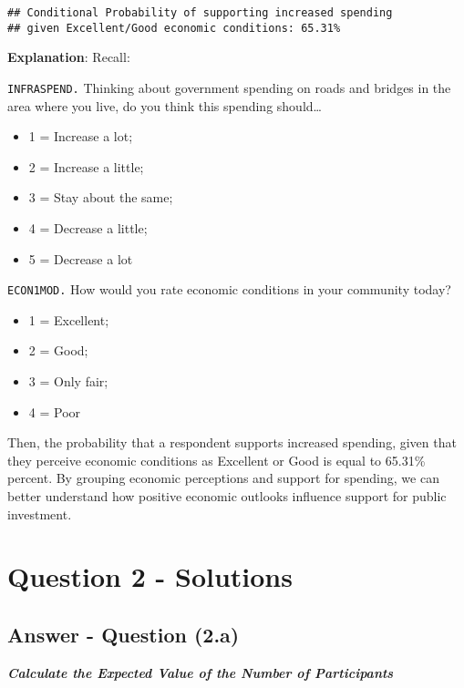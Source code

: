 \documentclass[
  11pt,
]{article}
\providecommand{\tightlist}{%
  \setlength{\itemsep}{0pt}\setlength{\parskip}{0pt}}
\begin{document}
\begin{verbatim}
## Conditional Probability of supporting increased spending
## given Excellent/Good economic conditions: 65.31%
\end{verbatim}

\textbf{Explanation}: Recall:

\texttt{INFRASPEND.} Thinking about government spending on roads and
bridges in the area where you live, do you think this spending
should\ldots{}

\begin{itemize}
\tightlist
\item
  1 = Increase a lot;
\item
  2 = Increase a little;
\item
  3 = Stay about the same;
\item
  4 = Decrease a little;
\item
  5 = Decrease a lot
\end{itemize}

\texttt{ECON1MOD.} How would you rate economic conditions in your
community today?

\begin{itemize}
\tightlist
\item
  1 = Excellent;
\item
  2 = Good;
\item
  3 = Only fair;
\item
  4 = Poor
\end{itemize}

Then, the probability that a respondent supports increased spending,
given that they perceive economic conditions as Excellent or Good is
equal to 65.31\% percent. By grouping economic perceptions and support
for spending, we can better understand how positive economic outlooks
influence support for public investment.

\section{Question 2 - Solutions}\label{question-2---solutions}

\subsection{Answer - Question (2.a)}\label{answer---question-2.a}

\textbf{\emph{Calculate the Expected Value of the Number of
Participants}}
\end{document}
